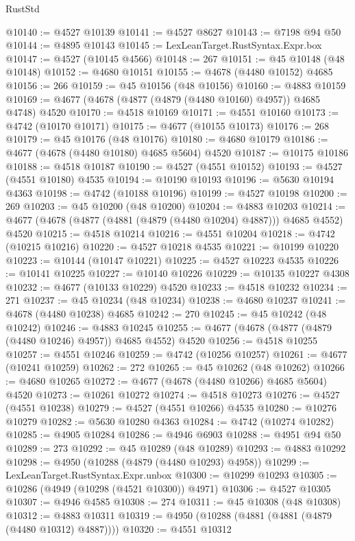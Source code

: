 \begin{lexlean}{RustStd}
\begin{coremodule}
@10140 := @4527 @10139
@10141 := @4527 @8627
@10143 := @7198 @94 @50
@10144 := @4895 @10143
@10145 := LexLeanTarget.RustSyntax.Expr.box
@10147 := @4527 (@10145 @4566)
@10148 := 267
@10151 := @45 @10148 (@48 @10148)
@10152 := @4680 @10151
@10155 := @4678 (@4480 @10152) @4685
@10156 := 266
@10159 := @45 @10156 (@48 @10156)
@10160 := @4883 @10159
@10169 := @4677 (@4678 (@4877 (@4879 (@4480 @10160) @4957)) @4685 @4748) @4520
@10170 := @4518 @10169
@10171 := @4551 @10160
@10173 := @4742 (@10170 @10171)
@10175 := @4677 (@10155 @10173)
@10176 := 268
@10179 := @45 @10176 (@48 @10176)
@10180 := @4680 @10179
@10186 := @4677 (@4678 (@4480 @10180) @4685 @5604) @4520
@10187 := @10175 @10186
@10188 := @4518 @10187
@10190 := @4527 (@4551 @10152)
@10193 := @4527 (@4551 @10180) @4535
@10194 := @10190 @10193
@10196 := @5630 @10194 @4363
@10198 := @4742 (@10188 @10196)
@10199 := @4527 @10198
@10200 := 269
@10203 := @45 @10200 (@48 @10200)
@10204 := @4883 @10203
@10214 := @4677 (@4678 (@4877 (@4881 (@4879 (@4480 @10204) @4887))) @4685 @4552) @4520
@10215 := @4518 @10214
@10216 := @4551 @10204
@10218 := @4742 (@10215 @10216)
@10220 := @4527 @10218 @4535
@10221 := @10199 @10220
@10223 := @10144 (@10147 @10221)
@10225 := @4527 @10223 @4535
@10226 := @10141 @10225
@10227 := @10140 @10226
@10229 := @10135 @10227 @4308
@10232 := @4677 (@10133 @10229) @4520
@10233 := @4518 @10232
@10234 := 271
@10237 := @45 @10234 (@48 @10234)
@10238 := @4680 @10237
@10241 := @4678 (@4480 @10238) @4685
@10242 := 270
@10245 := @45 @10242 (@48 @10242)
@10246 := @4883 @10245
@10255 := @4677 (@4678 (@4877 (@4879 (@4480 @10246) @4957)) @4685 @4552) @4520
@10256 := @4518 @10255
@10257 := @4551 @10246
@10259 := @4742 (@10256 @10257)
@10261 := @4677 (@10241 @10259)
@10262 := 272
@10265 := @45 @10262 (@48 @10262)
@10266 := @4680 @10265
@10272 := @4677 (@4678 (@4480 @10266) @4685 @5604) @4520
@10273 := @10261 @10272
@10274 := @4518 @10273
@10276 := @4527 (@4551 @10238)
@10279 := @4527 (@4551 @10266) @4535
@10280 := @10276 @10279
@10282 := @5630 @10280 @4363
@10284 := @4742 (@10274 @10282)
@10285 := @4905 @10284
@10286 := @4946 @6903
@10288 := @4951 @94 @50
@10289 := 273
@10292 := @45 @10289 (@48 @10289)
@10293 := @4883 @10292
@10298 := @4950 (@10288 (@4879 (@4480 @10293) @4958))
@10299 := LexLeanTarget.RustSyntax.Expr.unbox
@10300 := @10299 @10293
@10305 := @10286 (@4949 (@10298 (@4521 @10300)) @4971)
@10306 := @4527 @10305
@10307 := @4946 @4585
@10308 := 274
@10311 := @45 @10308 (@48 @10308)
@10312 := @4883 @10311
@10319 := @4950 (@10288 (@4881 (@4881 (@4879 (@4480 @10312) @4887))))
@10320 := @4551 @10312

\end{coremodule}
\end{lexlean}
